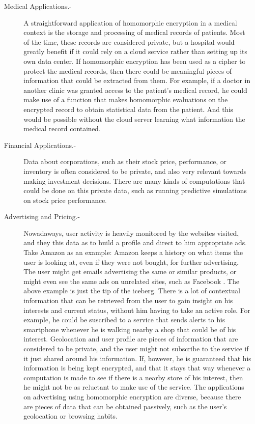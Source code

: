 \begin{description}
\item[Medical Applications.-] A straightforward application of homomorphic encryption in a medical context is the storage and processing of medical records of patients. Most of the time, these records are considered private, but a hospital would greatly benefit if it could rely on a cloud service rather than setting up its own data center. If homomorphic encryption has been used as a cipher to protect the medical records, then there could be meaningful pieces of information that could be extracted from them. For example, if a doctor in another clinic was granted access to the patient's medical record, he could make use of a function that makes homomorphic evaluations on the encrypted record to obtain statistical data from the patient. And this would be possible without the cloud server learning what information the medical record contained.
\item[Financial Applications.-] Data about corporations, such as their stock price, performance, or inventory is often considered to be private, and also very relevant towards making investment decisions. There are many kinds of computations that could be done on this private data, such as running predictive simulations on stock price performance. 
\item[Advertising and Pricing.-] Nowadaways, user activity is heavily monitored by the websites visited, and they this data as to build a profile and direct to him appropriate ads. Take Amazon as an example: Amazon keeps a history on what items the user is looking at, even if they were not bought, for further advertising. The user might get emails advertising the same or similar products, or might even see the same ads on unrelated sites, such as Facebook \cite{KimMai}. 
  The above example is just the tip of the iceberg. There is a lot of contextual information that can be retrieved from the user to gain insight on his interests and current status, without him having to take an active role. For example, he could be suscribed to a service that sends alerts to his smartphone whenever he is walking nearby a shop that could be of his interest. Geolocation and user profile are pieces of information that are considered to be private, and the user might not subscribe to the service if it just shared around his information. If, however, he is guaranteed that his information is being kept encrypted, and that it stays that way whenever a computation is made to see if there is a nearby store of his interest, then he might not be as reluctant to make use of the service. The applications on advertising using homomorphic encryption are diverse, because there are pieces of data that can be obtained passively, such as the user's geolocation or browsing habits.

\end{description}
